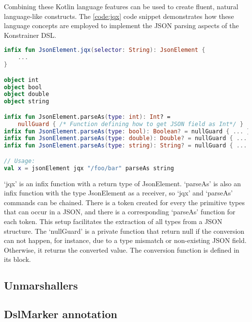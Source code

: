 Combining these Kotlin language features can be used to create fluent, natural language-like constructs. The \ref{code:jqx} code snippet demonstrates how these language concepts are employed to implement the JSON parsing aspects of the Konstrainer DSL.

\begin{lstlisting}[caption={jqx implementation},language=Kotlin,label=code:jqx]
infix fun JsonElement.jqx(selector: String): JsonElement {
    ...
}

object int
object bool
object double
object string

infix fun JsonElement.parseAs(type: int): Int? = 
    nullGuard { /* Function defining how to get JSON field as Int*/ }
infix fun JsonElement.parseAs(type: bool): Boolean? = nullGuard { ... }
infix fun JsonElement.parseAs(type: double): Double? = nullGuard { ... }
infix fun JsonElement.parseAs(type: string): String? = nullGuard { ... }

// Usage:
val x = jsonElement jqx "/foo/bar" parseAs string
\end{lstlisting}

`jqx' is an infix function with a return type of JsonElement. `parseAs' is also an infix function with the type JsonElement as a receiver, so `jqx' and `parseAs' commands can be chained. There is a token created for every the primitive types that can occur in a JSON, and there is a corresponding `parseAs' function for each token. This setup facilitates the extraction of all types from a JSON structure. The `nullGuard' is a private function that return null if the conversion can not happen, for instance, due to a type mismatch or non-existing JSON field. Otherwise, it returns the converted value. The conversion function is defined in its block.

\subsection{Unmarshallers}



\subsection{DslMarker annotation}




\begin{lstlisting}[caption={TODO},language=Kotlin,label=code:todo]

\end{lstlisting}